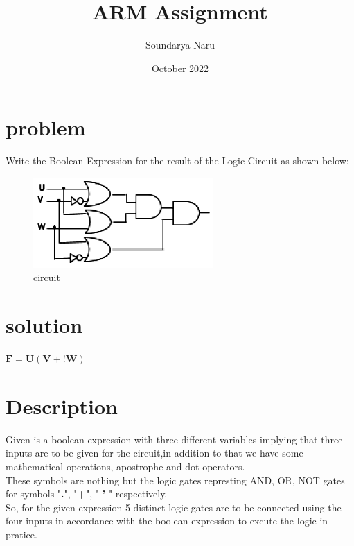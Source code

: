 \documentclass[10pt,twocolumn]{article}
\title{\textbf{ARM Assignment}}
\author{Soundarya Naru}
\date{October 2022}
\begin{document}
\maketitle
\section{problem}
 Write the Boolean Expression for the result of the Logic Circuit as shown below:
\begin{figure}[h]
    \centering
    \includegraphics[scale=1]{1.PNG}
     \caption{circuit}
      \label{fig:circuit}
\end{figure}
\section{solution}
    \begin{center}
    	${\boldsymbol{F}=\boldsymbol{U}(\boldsymbol{V}+\boldsymbol{!W})}$
    \end{center}
    
\section{Description}
\large
Given is a boolean expression with three different variables implying that three inputs are to be given for the circuit,in addition to that we have some mathematical operations, apostrophe and dot operators. \vspace{2mm} 
\\ These symbols are nothing but the logic gates
represting AND, OR, NOT gates for symbols "\textbf{.}", "\textbf{+}", " \textbf{'} " respectively. \vspace{2mm}
\\ So, for the given expression 5 distinct logic gates are to be connected using the four inputs in accordance with the boolean expression to excute the logic in pratice.
\end{document}
